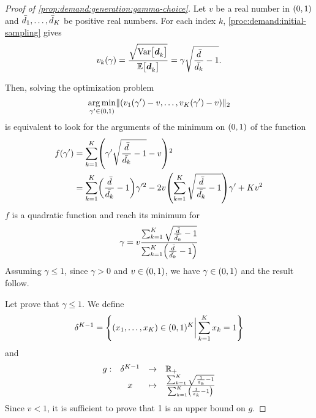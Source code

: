 \medskip


\begin{proof}[Proof of \cref{prop:demand:generation:gamma-choice}]
Let $v$ be a real number in $\bracket{0,1}$ and $\bar{d}_1,\ldots,\bar{d}_K$ be positive real numbers.
For each index $k$, \cref{proc:demand:initial-sampling} gives
\begin{equation}
  v_k\bracket{\gamma}
  = \frac{\sqrt{\vari\sqbracket{\va\demand_k}}}{\espe\sqbracket{\va\demand_k}}
  = \gamma\sqrt{\frac{\bar{\demand}}{\bar{\demand_k}}-1}.
\end{equation}

Then, solving the optimization problem
\begin{equation}\label{eq:dirichlet:optimization}
  \argmin_{\gamma'\in\bracket{0,1}} \norm{\bracket{v_1(\gamma')-v,\ldots,v_K(\gamma')-v}}_2
\end{equation}
is equivalent to look for the arguments of the minimum on $\bracket{0,1}$ of the function
\begin{subequations}
\begin{align}
  f\bracket{\gamma'}
  &= \sum_{k=1}^K \bracket{\gamma'\sqrt{\frac{\bar{\demand}}{\bar{\demand_k}}-1}-v}^2
  \\
  &= \sum_{k=1}^K\bracket{\frac{\bar{\demand}}{\bar{\demand_k}}-1}\gamma'^2
  - 2v\bracket{\sum_{k=1}^K\sqrt{\frac{\bar{\demand}}{\bar{\demand_k}}-1}}\gamma'
  + K v^2
\end{align}
\end{subequations}
$f$ is a quadratic function and reach its minimum for
\begin{equation}
  \gamma
  =
  v\frac
  {\sum_{k=1}^K\sqrt{\frac{\bar{\demand}}{\bar{\demand_k}}-1}}
  {\sum_{k=1}^K\bracket{\frac{\bar{\demand}}{\bar{\demand_k}}-1}}
\end{equation}
Assuming $\gamma\le 1$, since $\gamma>0$ and $v\in\bracket{0,1}$, we have $\gamma\in\bracket{0,1}$ and the result follow.

\medskip

Let prove that $\gamma\le 1$.
We define
\begin{equation}
  \delta^{K-1} = \crbracket{\bracket{x_1,\ldots,x_K}\in\bracket{0,1}^K \bigg| \sum_{k=1}^K x_k = 1}
\end{equation}
and
\begin{equation}
  \begin{array}{rccl}
  g: & \delta^{K-1} & \rightarrow & \RR_+ \\
     & x & \mapsto & \frac{\sum_{k=1}^K\sqrt{\frac{1}{x_k}-1}}{\sum_{k=1}^K\bracket{\frac{1}{x_k}-1}}
  \end{array}
\end{equation}
Since $v<1$, it is sufficient to prove that 1 is an upper bound on $g$.
\end{proof}


